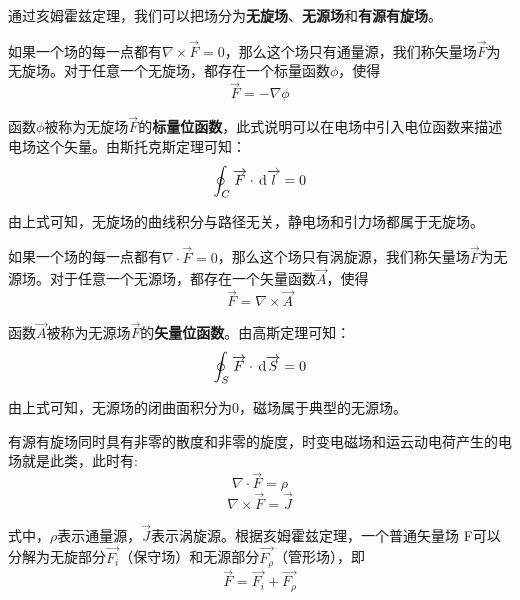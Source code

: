 \documentclass[UTF8,a4paper,11pt]{article}
\begin{document}
通过亥姆霍兹定理，我们可以把场分为\textbf{无旋场}、\textbf{无源场}和\textbf{有源有旋场}。

如果一个场的每一点都有$\nabla\times\overrightarrow{F}=0$，那么这个场只有通量源，我们称矢量场$\overrightarrow{F}$为无旋场。对于任意一个无旋场，都存在一个标量函数$\phi$，使得
\begin{equation}
\overrightarrow{F}=-\nabla\phi
\end{equation}

函数$\phi$被称为无旋场$\overrightarrow{F}$的\textbf{标量位函数}，此式说明可以在电场中引入电位函数来描述电场这个矢量。由斯托克斯定理可知：
\begin{equation}
\oint_C {\overrightarrow{F}}\cdot \,{\rm d}\overrightarrow{l}=0
\end{equation}

由上式可知，无旋场的曲线积分与路径无关，静电场和引力场都属于无旋场。

如果一个场的每一点都有$\nabla\cdot\overrightarrow{F}=0$，那么这个场只有涡旋源，我们称矢量场$\overrightarrow{F}$为无源场。对于任意一个无源场，都存在一个矢量函数$\overrightarrow{A}$，使得
\begin{equation}
\overrightarrow{F}=\nabla\times\overrightarrow{A}
\end{equation}

函数$\overrightarrow{A}$被称为无源场$\overrightarrow{F}$的\textbf{矢量位函数}。由高斯定理可知：
\begin{equation}
\oint_S {\overrightarrow{F}}\cdot \,{\rm d}\overrightarrow{S}=0
\end{equation}

由上式可知，无源场的闭曲面积分为0，磁场属于典型的无源场。

有源有旋场同时具有非零的散度和非零的旋度，时变电磁场和运云动电荷产生的电场就是此类，此时有:
\begin{equation}
\nabla\cdot\overrightarrow{F}=\rho
\end{equation}
\begin{equation}
\nabla\times\overrightarrow{F}=\overrightarrow{J}
\end{equation}

式中，$\rho$表示通量源，$\overrightarrow{J}$表示涡旋源。根据亥姆霍兹定理，一个普通矢量场 F可以分解为无旋部分$\overrightarrow{F_i}$（保守场）和无源部分$\overrightarrow{F_{\rho}}$（管形场），即
\begin{equation}
\overrightarrow{F}=\overrightarrow{F_i}+\overrightarrow{F_{\rho}}
\end{equation}
\end{document}
